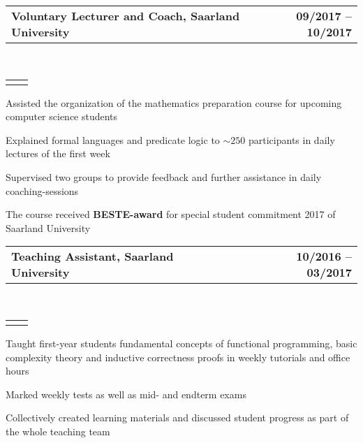 \documentclass[]{lukas-cv-openfont}
\makeatletter
\newcommand{\headerrow}[2]
{\begin{tabular*}{\linewidth}{l@{\extracolsep{\fill}}r}
	\fontspec{Helvetica}\fontsize{12pt}{12pt}\selectfont\bfseries{\color{subheadings}#1} &
	\fontspec{Helvetica}\fontsize{12pt}{12pt}\selectfont\bfseries{\color{subheadings}#2} \\
\end{tabular*}}
\newcommand{\locationrow}[2]
{\begin{tabular*}{\linewidth}{l@{\extracolsep{\fill}}r}
        \color{headings}\scshape\fontspec{Heiti TC Medium}\fontsize{10pt}{12pt}\selectfont{#1}  &
        \color{headings}\scshape\fontspec{Heiti TC Medium}\fontsize{10pt}{12pt}\selectfont{#2}  \\
\end{tabular*}}
\makeatother
\begin{document}
\noindent
\headerrow{Voluntary Lecturer and Coach, Saarland University}{09/2017 -- 10/2017}
\\
\locationrow{Mathematics Preparation Course}{}
\begin{tightitemize}{1.7em}
    \item Assisted the organization of the mathematics preparation course for upcoming computer science students%
    \item Explained formal languages and predicate logic to $\sim250$ participants in daily lectures of the first week
    \item Supervised two groups to provide feedback and further assistance in daily coaching-sessions
    \item The course received \textbf{BESTE-award} for special student commitment 2017 of Saarland University
\end{tightitemize}
\largesectionsep

\noindent
\headerrow{Teaching Assistant, Saarland University}{10/2016 -- 03/2017}
\\
\locationrow{Programming 1, Dependable Systems and Software Group}{}
\begin{tightitemize}{1.7em}
    \item Taught first-year students fundamental concepts of functional programming, basic complexity theory and inductive correctness proofs in weekly tutorials and office hours
    \item Marked weekly tests as well as mid- and endterm exams
    \item Collectively created learning materials and discussed student progress as part of the whole teaching team
\end{tightitemize}
\largesectionsep



\end{document}
